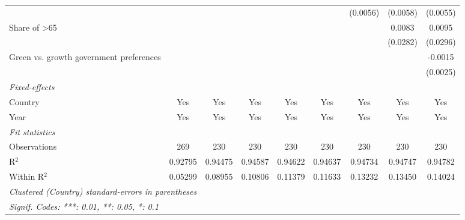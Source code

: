 \begin{table}[htbp]
\begin{tabular}{lcccccccc}
                                                       &               &               &          &          &          & (0.0056) & (0.0058) & (0.0055)\\   
      Share of >65                                     &               &               &          &          &          &          & 0.0083   & 0.0095\\   
                                                       &               &               &          &          &          &          & (0.0282) & (0.0296)\\   
      Green vs. growth government preferences          &               &               &          &          &          &          &          & -0.0015\\   
                                                       &               &               &          &          &          &          &          & (0.0025)\\   
      \midrule
      \emph{Fixed-effects}\\
      Country                                          & Yes           & Yes           & Yes      & Yes      & Yes      & Yes      & Yes      & Yes\\  
      Year                                             & Yes           & Yes           & Yes      & Yes      & Yes      & Yes      & Yes      & Yes\\  
      \midrule
      \emph{Fit statistics}\\
      Observations                                     & 269           & 230           & 230      & 230      & 230      & 230      & 230      & 230\\  
      R$^2$                                            & 0.92795       & 0.94475       & 0.94587  & 0.94622  & 0.94637  & 0.94734  & 0.94747  & 0.94782\\  
      Within R$^2$                                     & 0.05299       & 0.08955       & 0.10806  & 0.11379  & 0.11633  & 0.13232  & 0.13450  & 0.14024\\  
      \midrule \midrule
      \multicolumn{9}{l}{\emph{Clustered (Country) standard-errors in parentheses}}\\
      \multicolumn{9}{l}{\emph{Signif. Codes: ***: 0.01, **: 0.05, *: 0.1}}\\
   \end{tabular}
\end{table}


